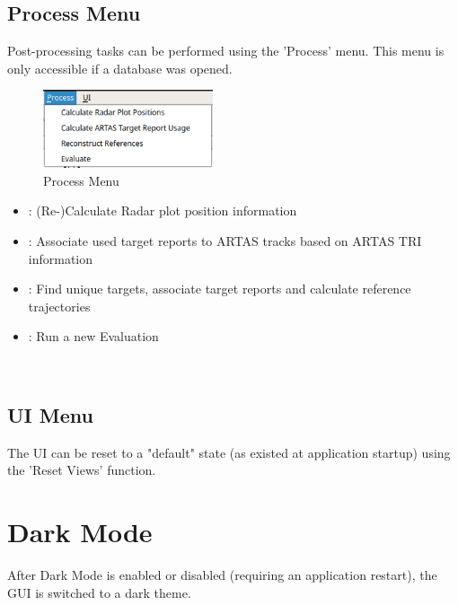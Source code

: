 \subsection{Process Menu}
\label{sec:ui_overview_process_menu}

Post-processing tasks can be performed using the 'Process' menu. This menu is only accessible if a database was opened.

\begin{figure}[H]
  \center
    \includegraphics[width=5cm,frame]{figures/ui_process_menu.png}
  \caption{Process Menu}
\end{figure}

\begin{itemize}
 \item {}: (Re-)Calculate Radar plot position information
 \item {}: Associate used target reports to ARTAS tracks based on ARTAS TRI information
 \item {}: Find unique targets, associate target reports and calculate reference trajectories
 \item {}: Run a new Evaluation
\end{itemize}
\  \\

\subsection{UI Menu}
\label{sec:ui_overview_ui_menu}

The UI can be reset to a "default" state (as existed at application startup) using the 'Reset Views' function.







\section{Dark Mode}
\label{sec:ui_overview_dark_mode}

After Dark Mode is enabled or disabled (requiring an application restart), the GUI is switched to a dark theme.

